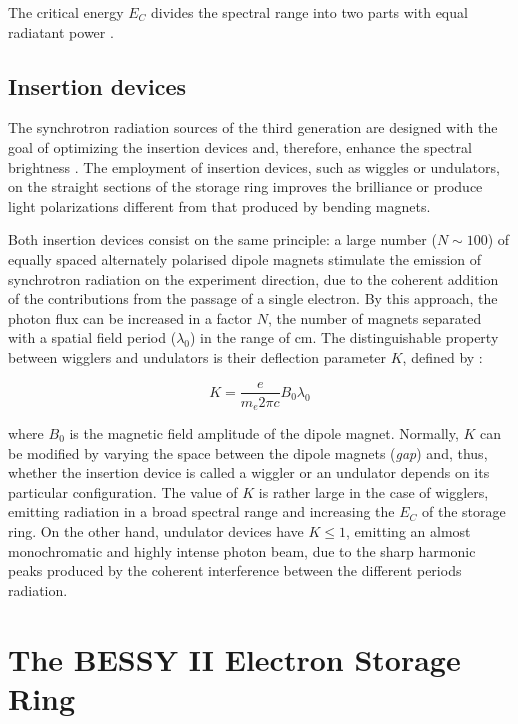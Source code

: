 The critical energy $E_C$ divides the spectral range into two parts with equal radiatant power \citep{baumgartel_e.-e._1984}.

\subsection{Insertion devices}

The synchrotron radiation sources of the third generation are designed with the goal of optimizing the insertion devices and, therefore, enhance the spectral brightness \citep{ries_nonlinear_2014}. The employment of insertion devices, such as wiggles or undulators, on the straight sections of the storage ring improves the brilliance or produce light polarizations different from that produced by bending magnets.

Both insertion devices consist on the same principle: a large number ($N\sim100$) of equally spaced alternately polarised dipole magnets stimulate the emission of synchrotron radiation on the experiment direction, due to the coherent addition of the contributions from the passage of a single electron. By this approach, the photon flux can be increased  in a factor $N$, the number of magnets separated with a spatial field period ($\lambda_0$) in the range of cm. The distinguishable property between wigglers and undulators is their deflection parameter $K$, defined by \citep{baumgartel_e.-e._1984}:

\begin{equation}
        K=\frac{e}{m_e 2\pi c}B_0\lambda_0
\end{equation}

where $B_0$ is the magnetic field amplitude of the dipole magnet. Normally, $K$ can be modified by varying the space between the dipole magnets (\emph{gap}) and, thus, whether the insertion device is  called a wiggler or an undulator depends on its particular configuration. The value of $K$ is rather large in the case of wigglers, emitting radiation in a broad spectral range and increasing the $E_C$ of the storage ring. On the other hand, undulator devices have $K\leq1$, emitting an almost monochromatic and highly intense photon beam, due to the sharp harmonic peaks produced by the coherent interference between the different periods radiation.

\section{The BESSY II Electron Storage Ring}

